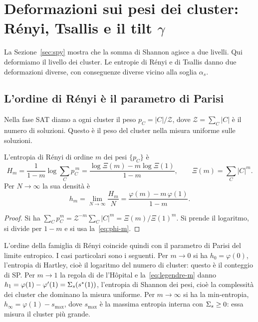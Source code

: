 \section{Deformazioni sui pesi dei cluster: Rényi, Tsallis e il tilt $\gamma$}
\label{sec:qaxis}

La Sezione~\ref{sec:spy} mostra che la somma di Shannon agisce a due livelli.
Qui deformiamo il livello dei cluster.
Le entropie di Rényi e di Tsallis danno due deformazioni diverse, con conseguenze diverse vicino alla soglia $\alpha_s$.

\subsection{L'ordine di Rényi è il parametro di Parisi}

Nella fase SAT diamo a ogni cluster il peso $p_C=|C|/\mathcal Z$, dove $\mathcal Z=\sum_C|C|$ è il numero di soluzioni.
Questo è il peso del cluster nella misura uniforme sulle soluzioni.

\begin{proposizione}
\label{prop:renyi-m}
L'entropia di Rényi di ordine $m$ dei pesi $\{p_C\}$ è
\begin{equation}
H_m=\frac{1}{1-m}\log\sum_Cp_C^{\,m}=\frac{\log\Xi(m)-m\log\Xi(1)}{1-m},\qquad \Xi(m)=\sum_C|C|^m.
\label{eq:renyi-clusters}
\end{equation}
Per $N\to\infty$ la sua densità è
\begin{equation}
h_m=\lim_{N\to\infty}\frac{H_m}{N}=\frac{\varphi(m)-m\,\varphi(1)}{1-m}.
\label{eq:hm}
\end{equation}
\end{proposizione}

\begin{proof}
Si ha $\sum_Cp_C^m=\mathcal Z^{-m}\sum_C|C|^m=\Xi(m)/\Xi(1)^m$.
Si prende il logaritmo, si divide per $1-m$ e si usa la~\eqref{eq:phi-m}.
\end{proof}

L'ordine della famiglia di Rényi coincide quindi con il parametro di Parisi del limite entropico.
I casi particolari sono i seguenti.
Per $m\to0$ si ha $h_0=\varphi(0)$, l'entropia di Hartley, cioè il logaritmo del numero di cluster: questo è il conteggio di SP.
Per $m\to1$ la regola di de l'Hôpital e la~\eqref{eq:legendre-m} danno $h_1=\varphi(1)-\varphi'(1)=\Sigma_s(s^*(1))$, l'entropia di Shannon dei pesi, cioè la complessità dei cluster che dominano la misura uniforme.
Per $m\to\infty$ si ha la min-entropia, $h_\infty=\varphi(1)-s_{\max}$, dove $s_{\max}$ è la massima entropia interna con $\Sigma_s\ge0$: essa misura il cluster più grande.

